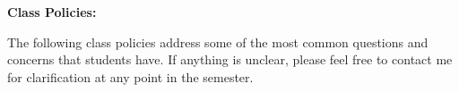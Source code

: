 \documentclass[12pt]{article}
\begin{document}




\bigskip

\textbf{Class Policies:} \vspace{6pt}

The following class policies address some of the most common
questions and concerns that students have. If anything is
unclear, please feel free to contact me for clarification at
any point in the semester.
\end{document}
